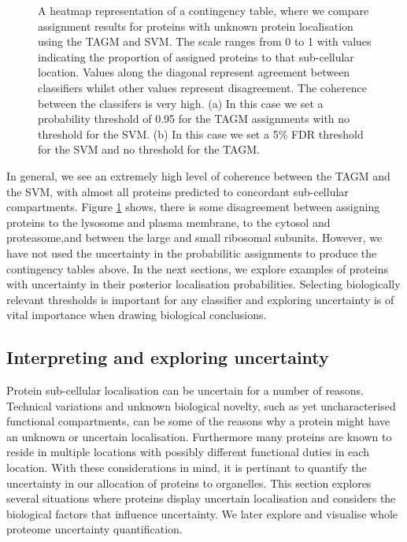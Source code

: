 \documentclass[12pt,english]{article}
\begin{document}
\begin{figure}[ht]
\begin{subfigure}[t]{0.5\textwidth}
        \caption{}
\end{subfigure}
  \caption{A heatmap representation of a contingency table,
    where we compare assignment results for proteins
    with unknown protein localisation using the TAGM and
    SVM. The scale ranges from 0 to 1 with values indicating
    the proportion of assigned proteins to that
    sub-cellular location. Values along the diagonal
    represent agreement between classifiers whilst other values
    represent disagreement. The coherence between the classifers is
    very high.
    (a)  In this case we set a probability threshold of 0.95
    for the TAGM assignments with no threshold for the SVM.
    (b)  In this case we set a 5\% FDR threshold for the SVM and
    no threshold for the TAGM.}
\label{figure:contigencytables}
\end{figure}

In general, we see an extremely high level of coherence between the
TAGM and the SVM, with almost all proteins predicted to
concordant sub-cellular compartments. Figure \ref{figure:contigencytables} shows,
there is some disagreement between assigning proteins to the lysosome and
plasma membrane, to the cytosol and proteasome,and between the large and small ribosomal subunits.
However, we have not used the uncertainty in the probabilitic assignments to produce the
contingency tables above. In the next sections, we explore examples of proteins
with uncertainty in their posterior localisation probabilities. Selecting
biologically relevant thresholds is important for any
classifier and exploring uncertainty is of vital importance
when drawing biological conclusions.


\subsection{Interpreting and exploring uncertainty}

Protein sub-cellular localisation can be uncertain for a number of
reasons. Technical variations and unknown biological novelty, such
as yet uncharacterised functional compartments,
can be some of the reasons why a protein might have an unknown
or uncertain localisation. Furthermore many proteins are known to
reside in multiple locations with possibly different functional duties
in each location. With these considerations in mind, it is pertinant
to quantify the uncertainty in our allocation of proteins to organelles.
This section explores several situations where proteins display uncertain
localisation and considers the biological factors that influence uncertainty.
We later explore and visualise whole proteome uncertainty quantification.
\end{document}
